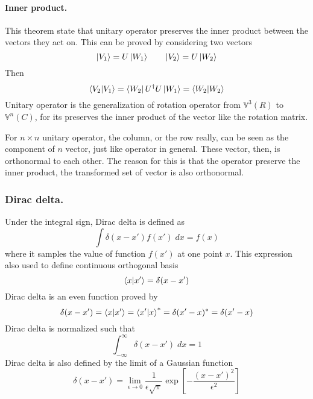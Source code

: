 \documentclass[../main.tex]{subfiles}
\begin{document}
\paragraph*{Inner product.} This theorem state that unitary operator preserves the inner product between the vectors they act on.
This can be proved by considering two vectors
\begin{equation*}
	\ket{V_1}=U \ket{W_1}\qquad \ket{V_2}=U \ket{W_2}
\end{equation*}
Then
\begin{equation*}
	\braket{V_2|V_1}=\bra{W_2}U ^\dagger U \ket{W_1}=\braket{W_2|W_2}
\end{equation*}
Unitary operator is the generalization of rotation operator from $\mathbb{V}^3(R)$ to $\mathbb{V}^n(C)$, for its preserves the inner product of the vector like the rotation matrix.

For $n\times n$ unitary operator, the column, or the row really, can be seen as the component of $n$ vector, just like operator in general.
These vector, then, is orthonormal to each other.
The reason for this is that the operator preserve the inner product, the transformed set of vector is also orthonormal.

\subsubsection*{Dirac delta.}
Under the integral sign, Dirac delta is defined as
\begin{equation*}
	\int \delta(x-x')f(x')\;dx=f(x)
\end{equation*}
where it samples the value of function $f(x')$ at one point $x$.
This expression also used to define continuous orthogonal basis
\begin{equation*}
	\braket{x|x'}=\delta(x-x')
\end{equation*}
Dirac delta is an even function proved by
\begin{equation*}
	\delta(x-x')=\braket{x|x'}=\braket{x'|x}^*=\delta(x'-x)^*=\delta(x'-x)
\end{equation*}
Dirac delta is normalized such that
\begin{equation*}
	\int_{-\infty}^{\infty}\delta(x-x')\;dx=1
\end{equation*}
Dirac delta is also defined by the limit of a Gaussian function
\begin{equation*}
	\delta (x-x')=\lim_{\epsilon \rightarrow 0}\frac{1}{\epsilon \sqrt{\pi}}\exp\left[-\frac{(x-x')^2 }{\epsilon^2}\right]
\end{equation*}
\end{document}
